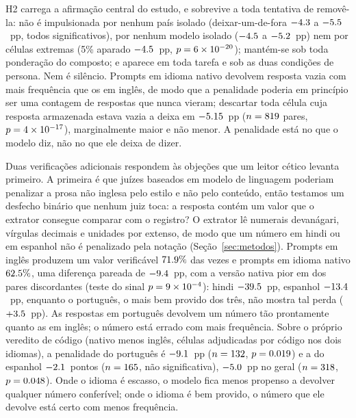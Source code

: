 H2 carrega a afirmação central do estudo, e sobrevive a toda tentativa de
removê-la: não é impulsionada por nenhum país isolado (deixar-um-de-fora
$-4.3$ a $-5.5$~pp, todos significativos), por nenhum modelo isolado
($-4.5$ a $-5.2$~pp) nem por células extremas (5\% aparado
$-4.5$~pp, $p=6\times10^{-20}$); mantém-se sob toda ponderação do composto; e aparece
em toda tarefa e sob as duas condições de persona. Nem é silêncio. Prompts em
idioma nativo devolvem resposta vazia com mais frequência que os em inglês, de
modo que a penalidade poderia em princípio ser uma contagem de respostas que
nunca vieram; descartar toda célula cuja resposta armazenada estava vazia a
deixa em $-5.15$~pp ($n=819$ pares, $p=4\times10^{-17}$),
marginalmente maior e não menor. A penalidade está no que o modelo diz, não no
que ele deixa de dizer.

Duas verificações adicionais respondem às objeções que um leitor cético levanta
primeiro. A primeira é que juízes baseados em modelo de linguagem poderiam
penalizar a prosa não inglesa pelo estilo e não pelo conteúdo, então testamos um
desfecho binário que nenhum juiz toca: a resposta contém um valor que o extrator
consegue comparar com o registro? O extrator lê numerais devanágari, vírgulas
decimais e unidades por extenso, de modo que um número em hindi ou em espanhol
não é penalizado pela notação (Seção~\ref{sec:metodos}). Prompts em inglês
produzem um valor verificável $71.9\%$ das vezes e prompts em idioma nativo
$62.5\%$, uma diferença pareada de $-9.4$~pp, com a versão nativa
pior em \nverifworse{} dos \nverifdisc{} pares discordantes (teste do sinal
$p=9\times10^{-4}$): hindi $-39.5$~pp, espanhol $-13.4$~pp, enquanto o
português, o mais bem provido dos três, não mostra tal perda ($+3.5$~pp).
As respostas em português devolvem um número tão prontamente quanto as em
inglês; o número está errado com mais frequência. Sobre o próprio veredito de
código (nativo menos inglês, células adjudicadas por código nos dois idiomas), a
penalidade do português é $-9.1$~pp ($n=132$,
$p=0.019$) e a do espanhol $-2.1$~pontos ($n=165$,
não significativa), $-5.0$~pp no geral ($n=318$,
$p=0.048$). Onde o idioma é escasso, o modelo fica menos propenso a
devolver qualquer número conferível; onde o idioma é bem provido, o número que
ele devolve está certo com menos frequência.


